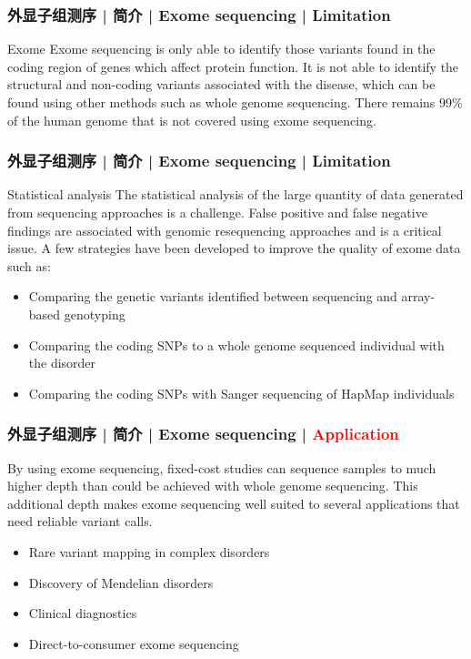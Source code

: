 \begin{frame}
  \frametitle{外显子组测序 | 简介 | Exome sequencing | Limitation}
  \begin{block}{Exome}
 Exome sequencing is only able to identify those variants found in the coding region of genes which affect protein function. It is not able to identify the structural and non-coding variants associated with the disease, which can be found using other methods such as whole genome sequencing. There remains 99\% of the human genome that is not covered using exome sequencing. 
  \end{block}
\end{frame}

\begin{frame}
  \frametitle{外显子组测序 | 简介 | Exome sequencing | Limitation}
  \begin{block}{Statistical analysis}
    The statistical analysis of the large quantity of data generated from sequencing approaches is a challenge. False positive and false negative findings are associated with genomic resequencing approaches and is a critical issue. A few strategies have been developed to improve the quality of exome data such as:
    \begin{itemize}
      \item Comparing the genetic variants identified between sequencing and array-based genotyping
      \item Comparing the coding SNPs to a whole genome sequenced individual with the disorder
      \item Comparing the coding SNPs with Sanger sequencing of HapMap individuals
    \end{itemize}
  \end{block}
\end{frame}

\begin{frame}
  \frametitle{外显子组测序 | 简介 | Exome sequencing | \textcolor{red}{Application}}
  By using exome sequencing, fixed-cost studies can sequence samples to much higher depth than could be achieved with whole genome sequencing. This additional depth makes exome sequencing well suited to several applications that need reliable variant calls.
  \begin{itemize}
    \item Rare variant mapping in complex disorders
    \item Discovery of Mendelian disorders
    \item Clinical diagnostics
    \item Direct-to-consumer exome sequencing
  \end{itemize}
\end{frame}

